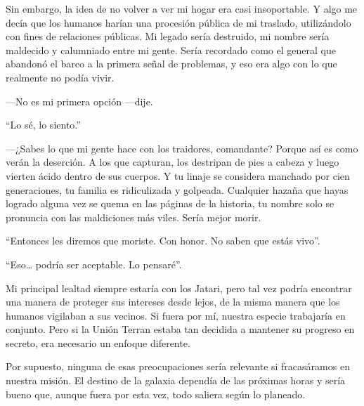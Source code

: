 Sin embargo, la idea de no volver a ver mi hogar era casi insoportable. Y algo me decía que los humanos harían una procesión pública de mi traslado, utilizándolo con fines de relaciones públicas. Mi legado sería destruido, mi nombre sería maldecido y calumniado entre mi gente. Sería recordado como el general que abandonó el barco a la primera señal de problemas, y eso era algo con lo que realmente no podía vivir.

—No es mi primera opción —dije.

``Lo sé, lo siento.''


—¿Sabes lo que mi gente hace con los traidores, comandante? Porque así es como verán la deserción. A los que capturan, los destripan de pies a cabeza y luego vierten ácido dentro de sus cuerpos. Y tu linaje se considera manchado por cien generaciones, tu familia es ridiculizada y golpeada. Cualquier hazaña que hayas logrado alguna vez se quema en las páginas de la historia, tu nombre solo se pronuncia con las maldiciones más viles. Sería mejor morir.

``Entonces les diremos que moriste. Con honor. No saben que estás vivo''.

``Eso… podría ser aceptable. Lo pensaré''.

Mi principal lealtad siempre estaría con los Jatari, pero tal vez podría encontrar una manera de proteger sus intereses desde lejos, de la misma manera que los humanos vigilaban a sus vecinos. Si fuera por mí, nuestra especie trabajaría en conjunto. Pero si la Unión Terran estaba tan decidida a mantener su progreso en secreto, era necesario un enfoque diferente.

Por supuesto, ninguna de esas preocupaciones sería relevante si fracasáramos en nuestra misión. El destino de la galaxia dependía de las próximas horas y sería bueno que, aunque fuera por esta vez, todo saliera según lo planeado.
